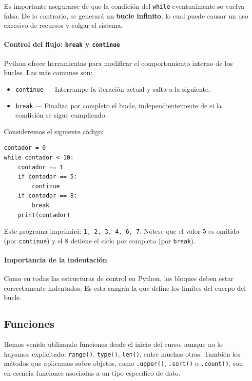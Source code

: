 \documentclass{article}
\theoremstyle{nonumberplain}
\begin{document}
Es importante asegurarse de que la condición del \texttt{while} eventualmente se vuelva falsa. De lo contrario, se generará un \textbf{bucle infinito}, lo cual puede causar un uso excesivo de recursos y colgar el sistema.

\paragraph{Control del flujo: \texttt{break} y \texttt{continue}}

Python ofrece herramientas para modificar el comportamiento interno de los bucles. Las más comunes son:

\begin{itemize}
    \item \texttt{continue} — Interrumpe la iteración actual y salta a la siguiente.
    \item \texttt{break} — Finaliza por completo el bucle, independientemente de si la condición se sigue cumpliendo.
\end{itemize}

Consideremos el siguiente código:

\begin{verbatim}
contador = 0
while contador < 10:
    contador += 1
    if contador == 5:
        continue
    if contador == 8:
        break
    print(contador)
\end{verbatim}

Este programa imprimirá: \texttt{1, 2, 3, 4, 6, 7}. Nótese que el valor 5 es omitido (por \texttt{continue}) y el 8 detiene el ciclo por completo (por \texttt{break}).

\paragraph{Importancia de la indentación}

Como en todas las estructuras de control en Python, los bloques deben estar correctamente indentados. Es esta sangría la que define los límites del cuerpo del bucle.

\subsection*{Funciones}

Hemos venido utilizando funciones desde el inicio del curso, aunque no lo hayamos explicitado: \texttt{range()}, \texttt{type()}, \texttt{len()}, entre muchas otras. También los métodos que aplicamos sobre objetos, como \texttt{.upper()}, \texttt{.sort()} o \texttt{.count()}, son en esencia funciones asociadas a un tipo específico de dato.
\end{document}
